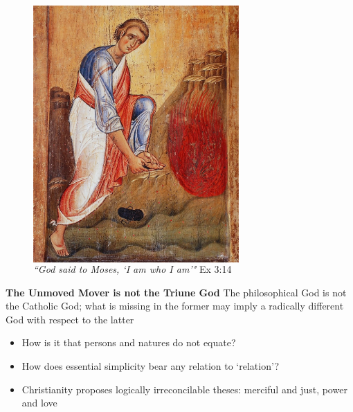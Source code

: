 \documentclass[xcolor=dvipsnames]{beamer}
\begin{document}
\begin{frame}[plain]
\begin{figure}
  \centering
  \begin{columns}
    \centering
    \includegraphics[width=0.7\textwidth,trim=0 100mm 0 0, clip]{burning-bush}
    \caption {\emph{``God said to Moses, `I am who I am'"} Ex 3:14}
  \end{columns}
\end{figure}
\end{frame}


\begin{frame}[plain]
\textbf{The Unmoved Mover is not the Triune God}\newline
The philosophical God is not the Catholic God; what is missing in the former may imply a radically different God with respect to the latter \vspace{10mm}
\begin{itemize}
\item How is it that persons and natures do not equate?\vspace{5mm}
\item How does essential simplicity bear any relation to `relation'?\vspace{5mm}
\item Christianity proposes logically irreconcilable theses: merciful and just, power and love\vspace{5mm}
\end{itemize}
\end{frame}
\end{document}
